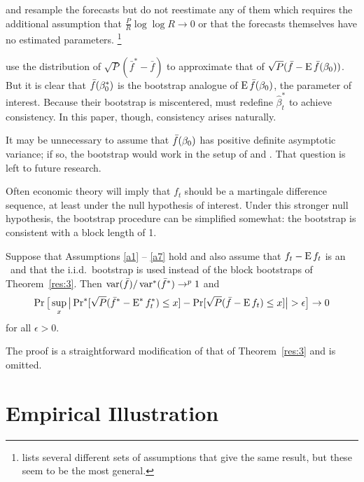 \documentclass[12pt,fleqn]{article}
\begin{document}
\begin{rem}
  \citet{Whi:00} and \citet{Han:05} resample the forecasts but do not
  reestimate any of them which requires the additional assumption that
  $\tfrac{P}{R} \log \log R \to 0$ or that the forecasts themselves
  have no estimated parameters.%
\footnote{\citet{Whi:00} lists several
    different sets of assumptions that give the same result, but these
    seem to be the most general.} %
\end{rem}

\begin{rem}
  \citet{CoS:07} use the distribution of $\sqrt{P}(\bar{f}^{*} -
  \bar{f})$ to approximate that of $\sqrt{P}(\bar{f} - \operatorname{E}
  \bar{f}(\beta_0))$.  But it is clear that $\bar{f}(\beta_0^*)$
  is the bootstrap analogue of $\operatorname{E} \bar{f}(\beta_0)$, the parameter of
  interest.  Because their bootstrap is miscentered, \citet{CoS:07}
  must redefine $\hat{\beta}_t^{*}$ to achieve consistency.  In this
  paper, though, consistency arises naturally.
\end{rem}

\begin{rem}
  It may be unnecessary to assume that $\bar{f}(\beta_0)$ has positive
  definite asymptotic variance; if so, the bootstrap would work in the
  setup of \citet{ClM:05,ClM:01} and \citet{Mcc:07}.  That question is
  left to future research.
\end{rem}

Often economic theory will imply that $f_t$ should be a martingale
difference sequence, at least under the null hypothesis of interest.
Under this stronger null hypothesis, the bootstrap procedure can be
simplified somewhat: the bootstrap is consistent with a block length
of 1.
\begin{thm}
  Suppose that Assumptions \ref{a1} -- \ref{a7} hold and also assume
  that $f_t - \operatorname{E} f_t$ is an \mds\ and that the i.i.d.\ bootstrap is
  used instead of the block bootstraps of Theorem~\ref{res:3}. Then
  $\operatorname{var}(\bar f)/\operatorname{var}^*(\bar f^*) \to^p 1$
  and
  \begin{equation}\label{eq:20}
    \operatorname{Pr}\big[\sup_x \big\lvert \operatorname{Pr}^*[\sqrt{P} (\bar f^* - \operatorname{E}^* f_t^*) \leq x]
    - \operatorname{Pr}[\sqrt{P}( \bar{f} - \operatorname{E} f_t) \leq x] \big\rvert > \epsilon\big] \to 0
  \end{equation}
  for all $\epsilon > 0$.
\end{thm}
The proof is a straightforward modification of that of
Theorem~\ref{res:3} and is omitted.

\section{Empirical Illustration}\label{sec:3}
\end{document}
